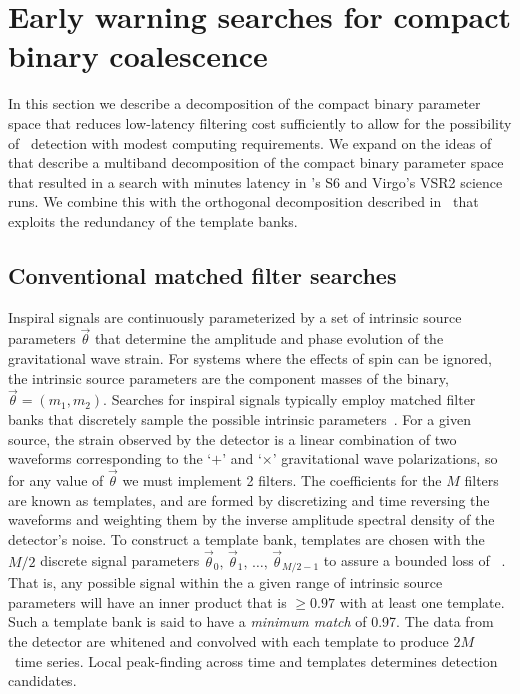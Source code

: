 \section{Early warning searches for compact binary coalescence}
\label{SECII}\label{sec:method}

In this section we describe a decomposition of the compact binary parameter
space that reduces low-latency filtering cost sufficiently to allow for the
possibility of \earlywarning\ detection with modest computing requirements.  We
expand on the ideas of~\cite{Marion2004, Buskulic2010} that describe a
multiband decomposition of the compact binary parameter space that resulted in a
search with minutes latency in \LIGO{}'s S6 and Virgo's VSR2 science runs.
We combine this with the orthogonal decomposition described
in~\cite{Cannon:2010p10398} that exploits the redundancy of the template banks.

\subsection{Conventional \CBC{} matched filter searches}

Inspiral signals are continuously parameterized by a set of intrinsic source parameters
$\vec\theta$ that determine the amplitude and phase evolution of the gravitational wave strain. For systems where the effects of spin can be ignored, the
intrinsic source parameters are the component masses of the binary, $\vec\theta =
(m_1, m_2)$. Searches for inspiral signals
typically employ matched filter banks that discretely
sample the possible intrinsic parameters~\cite{findchirppaper}.  For a given source, the strain observed by the detector is a linear combination of two waveforms corresponding to the `$+$' and `$\times$' gravitational wave polarizations, so for any value of $\vec\theta$ we must implement 2 filters.  The coefficients for the $M$ filters
are known as templates, and are formed by discretizing and time reversing the waveforms and weighting them by the inverse amplitude spectral density of the detector's noise. To construct a template bank, templates are chosen with the $M/2$ discrete signal parameters $\vec\theta_0,\, \vec\theta_1,\, \dots,\, \vec\theta_{M/2-1}$ to assure a
bounded loss of \SNR~\cite{Owen:1995tm,Owen:1998dk}. That is, any possible
signal within the a given range of intrinsic source parameters will have an inner product that is $\geqslant 0.97$ with
at least one template. Such a template bank is said to have a {\em
minimum match} of 0.97. The data from the detector are whitened and convolved with each template to produce $2M$ \SNR\
time series. Local peak-finding across time and templates determines detection
candidates.

